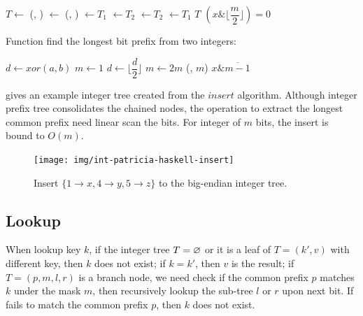 \documentclass[b5paper]{article}
\begin{document}
\begin{algorithmic}[1]
  \State $T \gets$ 
  \State (, ) $\gets$ (, )
    \State {} $\gets T_1$
    \State {} $\gets T_2$
  \Else
    \State {} $\gets T_2$
    \State {} $\gets T_1$
  \EndIf
  \State \Return $T$
\EndFunction
\Statex
{}
  \State \Return $(x \& \lfloor \dfrac{m}{2} \rfloor) = 0$
\EndFunction
\end{algorithmic}

Function  find the longest bit prefix from two integers:

\begin{algorithmic}[1]
  \State $d \gets xor(a, b)$
  \State $m \gets 1$
    \State $d \gets \lfloor \dfrac{d}{2} \rfloor$
    \State $m \gets 2m$
  \EndWhile
  \State \Return (, $m$)
\EndFunction
\Statex
{}
  \State \Return $x \& \overline{m - 1}$
\EndFunction
\Statex
\end{algorithmic}

 gives an example integer tree created from the $insert$ algorithm. Although integer prefix tree consolidates the chained nodes, the operation to extract the longest common prefix need linear scan the bits. For integer of $m$ bits, the insert is bound to $O(m)$.

\begin{figure}[htbp]
  \centering
  \texttt{[image: img/int-patricia-haskell-insert]}
  \caption{Insert $\{1 \rightarrow x, 4 \rightarrow y, 5 \rightarrow z\}$ to the big-endian integer tree.}
  \label{fig:int-patricia-haskell-insert}
\end{figure}


\subsection{Lookup}

When lookup key $k$, if the integer tree $T = \varnothing$ or it is a leaf of $T = (k', v)$ with different key, then $k$ does not exist; if $k = k'$, then $v$ is the result; if $T = (p, m, l, r)$ is a branch node, we need check if the common prefix $p$ matches $k$ under the mask $m$, then recursively lookup the sub-tree $l$ or $r$ upon next bit. If fails to match the common prefix $p$, then $k$ does not exist.
\end{document}
